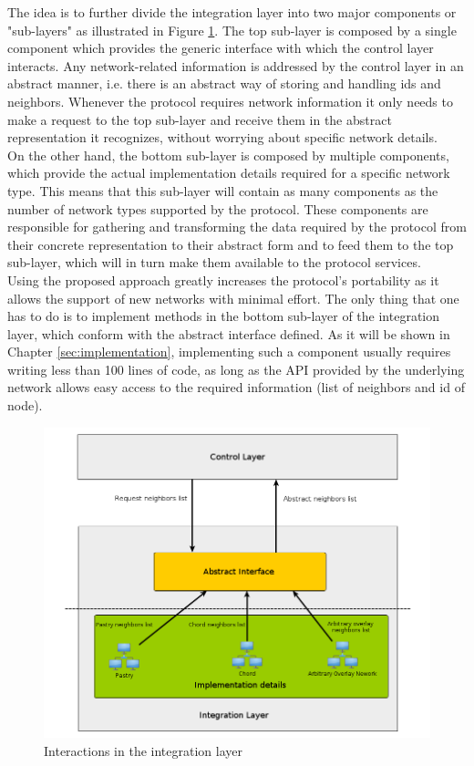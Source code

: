 \documentclass[a4paper,11pt,twoside]{report}
\begin{document}
The idea is to further divide the integration layer into two major components or "sub-layers" as illustrated in Figure \ref{fig:integration_layer}. The top sub-layer is composed by a single component which provides the generic interface with which the control layer interacts. Any network-related information is addressed by the control layer in an abstract manner, i.e. there is an abstract way of storing and handling ids and neighbors. Whenever the protocol requires network information it only needs to make a request to the top sub-layer and receive them in the abstract representation it recognizes, without worrying about specific network details. \\

On the other hand, the bottom sub-layer is composed by multiple components, which provide the actual implementation details required for a specific network type. This means that this sub-layer will contain as many components as the number of network types supported by the protocol. These components are responsible for gathering and transforming the data required by the protocol from their concrete representation to their abstract form and to feed them to the top sub-layer, which will in turn make them available to the protocol services.\\

Using the proposed approach greatly increases the protocol's portability as it allows the support of new networks with minimal effort. The only thing that one has to do is to implement methods in the bottom sub-layer of the integration layer, which conform with the abstract interface defined. As it will be shown in Chapter \ref{sec:implementation}, implementing such a component usually requires writing less than 100 lines of code, as long as the API provided by the underlying network allows easy access to the required information (list of neighbors and id of node).


\begin{figure}[]
   \centering
     \includegraphics[scale=0.4]{../figures/integration_layer.png}
	 \caption{Interactions in the integration layer}
     \label{fig:integration_layer}
\end{figure}
\end{document}
